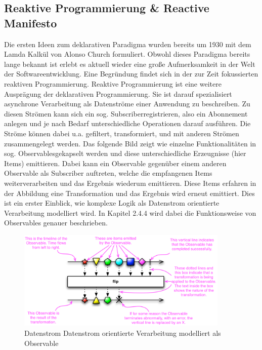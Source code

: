 \documentclass[12pt,oneside,a4paper,bibtotoc,liststotoc]{scrreprt}
\begin{document}
\subsection{Reaktive Programmierung \& Reactive Manifesto}
Die ersten Ideen zum deklarativen Paradigma wurden bereits um 1930 mit dem Lamda Kalkül von Alonso Church formuliert. Obwohl dieses Paradigma bereits lange bekannt ist erlebt es aktuell wieder eine große Aufmerksamkeit in der Welt der Softwareentwicklung. Eine Begründung findet sich in der zur Zeit fokussierten reaktiven Programmierung. Reaktive Programmierung ist eine weitere Ausprägung der deklarativen Programmierung. Sie ist darauf spezialisiert asynchrone Verarbeitung als Datenströme einer Anwendung zu beschreiben. Zu diesen Strömen kann sich ein sog. \glqq Subscriber\grqq registrieren, also ein Abonnement anlegen und je nach Bedarf unterschiedliche Operationen darauf ausführen. Die Ströme können dabei u.a. gefiltert, transformiert, und mit anderen Strömen zusammengelegt werden. Das folgende Bild zeigt wie einzelne Funktionalitäten in sog. \glqq Observables\grqq gekapselt werden und diese unterschiedliche Erzeugnisse (hier Items) emittieren. Dabei kann ein Observable gegenüber einem anderen Observable als Subscriber auftreten, welche die empfangenen Items weiterverarbeiten und das Ergebnis wiederum emittieren. Diese Items erfahren in der Abbildung eine Transformation und das Ergebnis wird erneut emittiert. Dies ist ein erster Einblick, wie komplexe Logik als Datenstrom orientierte Verarbeitung modelliert wird. In Kapitel 2.4.4 wird dabei die Funktionsweise von Observables genauer beschrieben.
\begin{figure}[H]
  \begin{centering}
    \includegraphics[width=0.9\textwidth]{img/Observable.png}
    \caption{Datenstrom Datenstrom orientierte Verarbeitung modelliert als Observable \cite[vgl. Abschnitt zu Observable]{rxAllgDoku} }
    \label{Observable}
  \end{centering}
\end{figure}
\end{document}
